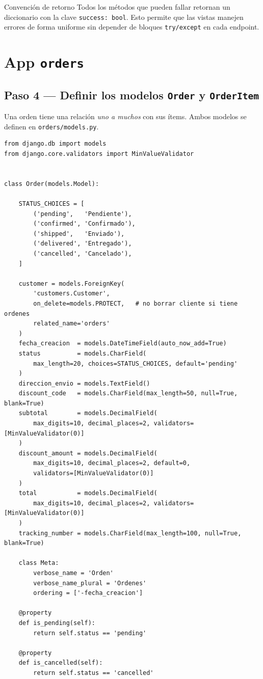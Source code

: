 \documentclass[12pt, a4paper]{article}
\begin{document}
\begin{tipbox}{Convención de retorno}
Todos los métodos que pueden fallar retornan un diccionario con la clave \texttt{success: bool}. Esto permite que las vistas manejen errores de forma uniforme sin depender de bloques \texttt{try/except} en cada endpoint.
\end{tipbox}

\newpage
\section{App \texttt{orders}}

\subsection{Paso 4 — Definir los modelos \texttt{Order} y \texttt{OrderItem}}

Una orden tiene una relación \textit{uno a muchos} con sus ítems. Ambos modelos se definen en \texttt{orders/models.py}.

\begin{lstlisting}[caption={orders/models.py — modelo Order}]
from django.db import models
from django.core.validators import MinValueValidator


class Order(models.Model):

    STATUS_CHOICES = [
        ('pending',   'Pendiente'),
        ('confirmed', 'Confirmado'),
        ('shipped',   'Enviado'),
        ('delivered', 'Entregado'),
        ('cancelled', 'Cancelado'),
    ]

    customer = models.ForeignKey(
        'customers.Customer',
        on_delete=models.PROTECT,   # no borrar cliente si tiene ordenes
        related_name='orders'
    )
    fecha_creacion  = models.DateTimeField(auto_now_add=True)
    status          = models.CharField(
        max_length=20, choices=STATUS_CHOICES, default='pending'
    )
    direccion_envio = models.TextField()
    discount_code   = models.CharField(max_length=50, null=True, blank=True)
    subtotal        = models.DecimalField(
        max_digits=10, decimal_places=2, validators=[MinValueValidator(0)]
    )
    discount_amount = models.DecimalField(
        max_digits=10, decimal_places=2, default=0,
        validators=[MinValueValidator(0)]
    )
    total           = models.DecimalField(
        max_digits=10, decimal_places=2, validators=[MinValueValidator(0)]
    )
    tracking_number = models.CharField(max_length=100, null=True, blank=True)

    class Meta:
        verbose_name = 'Orden'
        verbose_name_plural = 'Ordenes'
        ordering = ['-fecha_creacion']

    @property
    def is_pending(self):
        return self.status == 'pending'

    @property
    def is_cancelled(self):
        return self.status == 'cancelled'
\end{lstlisting}
\end{document}
